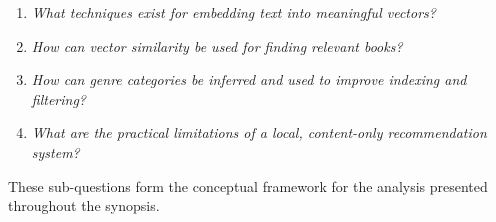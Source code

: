 \begin{enumerate}
    \item \label{itm:subq-embedding} \textit{What techniques exist for embedding text into meaningful vectors?}
    \item \label{itm:subq-similarity} \textit{How can vector similarity be used for finding relevant books?}
    \item \label{itm:subq-classification} \textit{How can genre categories be inferred and used to improve indexing and filtering?}
    \item \label{itm:subq-limitations} \textit{What are the practical limitations of a local, content-only recommendation system?}
\end{enumerate}

These sub-questions form the conceptual framework for the analysis presented throughout the synopsis.
